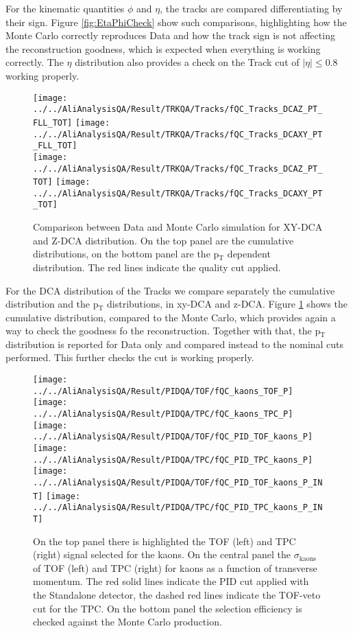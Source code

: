 For the kinematic quantities $\phi$ and $\eta$, the tracks are compared differentiating by their sign. Figure \ref{fig:EtaPhiCheck} show such comparisons, highlighting how the Monte Carlo correctly reproduces Data and how the track sign is not affecting the reconstruction goodness, which is expected when everything is working correctly. The $\eta$ distribution also provides a check on the Track cut of $| \eta | \leq 0.8$ working properly.

\begin{figure}
\texttt{[image: ../../AliAnalysisQA/Result/TRKQA/Tracks/fQC\_Tracks\_DCAZ\_PT\_FLL\_TOT]}
\texttt{[image: ../../AliAnalysisQA/Result/TRKQA/Tracks/fQC\_Tracks\_DCAXY\_PT\_FLL\_TOT]}\\
\texttt{[image: ../../AliAnalysisQA/Result/TRKQA/Tracks/fQC\_Tracks\_DCAZ\_PT\_TOT]}
\texttt{[image: ../../AliAnalysisQA/Result/TRKQA/Tracks/fQC\_Tracks\_DCAXY\_PT\_TOT]}
\caption{Comparison between Data and Monte Carlo simulation for XY-DCA and Z-DCA distribution. On the top panel are the cumulative distributions, on the bottom panel are the p$_{\text{T}}$ dependent distribution. The red lines indicate the quality cut applied. }
\label{fig:DCACheck}
\end{figure}

For the DCA distribution of the Tracks we compare separately the cumulative distribution and the p$_{\text{T}}$ distributions, in xy-DCA and z-DCA. Figure \ref{fig:DCACheck} shows the cumulative distribution, compared to the Monte Carlo, which provides again a way to check the goodness fo the reconstruction. Together with that, the p$_{\text{T}}$ distribution is reported for Data only and compared instead to the nominal cuts performed. This further checks the cut is working properly.

\begin{figure}
\texttt{[image: ../../AliAnalysisQA/Result/PIDQA/TOF/fQC\_kaons\_TOF\_P]}
\texttt{[image: ../../AliAnalysisQA/Result/PIDQA/TPC/fQC\_kaons\_TPC\_P]}\\
\texttt{[image: ../../AliAnalysisQA/Result/PIDQA/TOF/fQC\_PID\_TOF\_kaons\_P]}
\texttt{[image: ../../AliAnalysisQA/Result/PIDQA/TPC/fQC\_PID\_TPC\_kaons\_P]}\\
\texttt{[image: ../../AliAnalysisQA/Result/PIDQA/TOF/fQC\_PID\_TOF\_kaons\_P\_INT]}
\texttt{[image: ../../AliAnalysisQA/Result/PIDQA/TPC/fQC\_PID\_TPC\_kaons\_P\_INT]}\\
\caption{On the top panel there is highlighted the TOF (left) and TPC (right) signal selected for the kaons. On the central panel the $\sigma_{\text{kaons}}$ of TOF (left) and TPC (right) for kaons as a function of transverse momentum. The red solid lines indicate the PID cut applied with the Standalone detector, the dashed red lines indicate the TOF-veto cut for the TPC. On the bottom panel the selection efficiency is checked against the Monte Carlo production.}
\label{fig:PIDCheck}
\end{figure}

